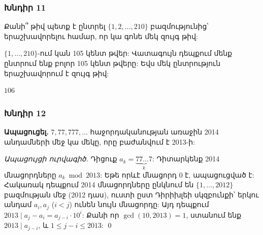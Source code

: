 \subsubsection*{Խնդիր 11}
Քանի՞ թիվ պետք է ընտրել $\{1,2,\dots,210\}$ բազմությունից՝ երաշխավորելու համար, որ կա գոնե մեկ զույգ թիվ:

$\{1,\dots,210\}$-ում կան 105 կենտ թվեր: Վատագույն դեպքում մենք ընտրում ենք բոլոր 105 կենտ թվերը: Եվս մեկ ընտրություն երաշխավորում է զույգ թիվ:

$\boxed{106}$

\subsubsection*{Խնդիր 12}
\textbf{Ապացուցել.} $7, 77, 777, \ldots$ հաջորդականության առաջին 2014 անդամների մեջ կա մեկը, որը բաժանվում է 2013-ի:

\textit{Ապացույցի ուրվագիծ.}
Դիցուք $a_k = \underbrace{77\ldots7}_{k}$: Դիտարկենք 2014 մնացորդները $a_k \bmod 2013$: Եթե որևէ մնացորդ 0 է, ապացուցված է: Հակառակ դեպքում 2014 մնացորդները ընկնում են $\{1,\dots,2012\}$ բազմության մեջ (2012 դաս), ուստի ըստ Դիրիխլեի սկզբունքի՝ երկու անդամ $a_i, a_j$ ($i<j$) ունեն նույն մնացորդը: Այդ դեպքում $2013 \mid a_j - a_i = a_{j-i}\cdot 10^i$: Քանի որ $\gcd(10,2013)=1$, ստանում ենք $2013\mid a_{j-i}$, և $1\le j-i\le 2013$: \qed